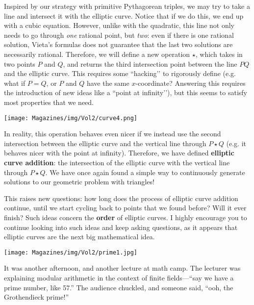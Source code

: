 \documentclass{article}
\begin{document}
\begin{multicols}{3}
Inspired by our strategy with primitive Pythagorean triples, we may try to take a line and intersect it with the elliptic curve. Notice that if we do this, we end up with a cubic equation. However, unlike with the quadratic, this line not only needs to go through \textit{one} rational point, but \textit{two}: even if there is one rational solution, Vieta’s formulas does not guarantee that the last two solutions are necessarily rational. Therefore, we will define a new operation $\star$, which takes in two points $P$ and $Q$, and returns the third intersection point between the line $PQ$ and the elliptic curve. This requires some ``hacking’’ to rigorously define (e.g. what if $P=Q$, or $P$ and $Q$ have the same $x$-coordinate? Answering this requires the introduction of new ideas like a ``point at infinity’’), but this seems to satisfy most properties that we need.

\begin{center}
    \texttt{[image: Magazines/img/Vol2/curve4.png]}
\end{center}

In reality, this operation behaves even nicer if we instead use the second intersection between the elliptic curve and the vertical line through $P\star Q$ (e.g. it behaves nicer with the point at infinity). Therefore, we have defined \textbf{elliptic curve addition}: the intersection of the elliptic curve with the vertical line through $P\star Q$. We have once again found a simple way to continuously generate solutions to our geometric problem with triangles!

This raises new questions: how long does the process of elliptic curve addition continue, until we start cycling back to points that we found before? Will it ever finish? Such ideas concern the \textbf{order} of elliptic curves. I highly encourage you to continue looking into such ideas and keep asking questions, as it appears that elliptic curves are the next big mathematical idea.
\closearticle

\begin{center}
    \texttt{[image: Magazines/img/Vol2/prime1.jpg]}
\end{center}

It was another afternoon, and another lecture at math camp. The lecturer was explaining modular arithmetic in the context of finite fields—“say we have a prime number, like 57.” The audience chuckled, and someone said, “ooh, the Grothendieck prime!”


\end{multicols}
\end{document}
